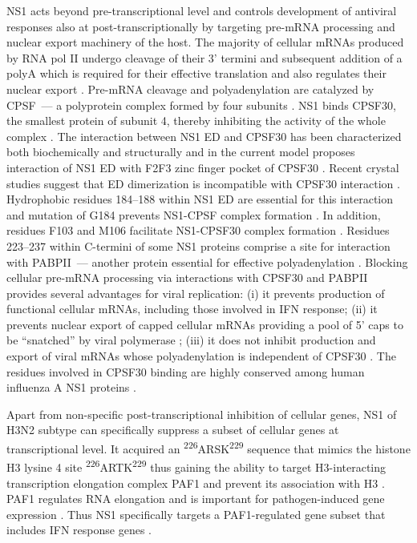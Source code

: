 		NS1 acts beyond pre-transcriptional level and controls development of antiviral responses also at post-transcriptionally by targeting pre-mRNA processing and nuclear export machinery of the host.
		The majority of cellular mRNAs produced by RNA pol II undergo cleavage of their 3' termini and subsequent addition of a \gls{polyA} which is required for their effective translation and also regulates their nuclear export \parencite{Vassalli1989, Zarkower1987, Huang1996}. Pre-mRNA cleavage and polyadenylation are catalyzed by \gls{CPSF}~--- a polyprotein complex formed by four subunits \parencite{Wilusz1990, Colgan1997}. NS1 binds \gls{CPSF}30, the smallest protein of subunit 4, thereby inhibiting the activity of the whole complex \parencite{Nemeroff1998}. The interaction between NS1 \gls{ED} and \gls{CPSF}30 has been  characterized both biochemically and structurally and in the current model proposes interaction of NS1 ED with F2F3 zinc finger pocket of \gls{CPSF}30 \parencite{Noah2003, Twu2006, Kochs2007, Das2008}. Recent crystal studies suggest that ED dimerization is incompatible with \gls{CPSF}30 interaction \parencite{Aramini2011, Kerry2011}. Hydrophobic residues 184--188 within NS1 ED are essential for this interaction and mutation of G184 prevents NS1-CPSF complex formation \parencite{Das2008}. In addition, residues F103 and M106 facilitate NS1-CPSF30 complex formation \parencite{Kochs2007, Das2008}. Residues 223--237 within C-termini of some \gls{NS1} proteins comprise a site for interaction with \gls{PABP}II~--- another protein essential for effective polyadenylation \parencite{Li2001a}. Blocking cellular pre-mRNA processing via interactions with \gls{CPSF}30 and \gls{PABP}II provides several advantages for viral replication: (i) it prevents production of functional cellular mRNAs, including those involved in \gls{IFN} response; (ii) it prevents nuclear export of capped cellular mRNAs providing a pool of 5' caps to be ``snatched'' by viral polymerase \parencite{Nemeroff1998}; (iii) it does not inhibit production and export of viral mRNAs whose polyadenylation is independent of \gls{CPSF}30 \parencite{Plotch1977}. The residues involved in \gls{CPSF}30 binding are highly conserved among human influenza A NS1 proteins \parencite{Kochs2007, Das2008}. 
		
		Apart from non-specific post-transcriptional inhibition of cellular genes, NS1 of H3N2 subtype can specifically suppress a subset of cellular genes at transcriptional level. It acquired an \textsuperscript{226}ARSK\textsuperscript{229} sequence that mimics the histone H3 lysine 4 site \textsuperscript{226}ARTK\textsuperscript{229} thus gaining the ability to target  H3-interacting transcription elongation complex PAF1 and prevent its association with H3 \parencite{Marazzi2012}. PAF1 regulates RNA elongation and is important for pathogen-induced gene expression \parencite{Newey2009}. Thus NS1 specifically targets a PAF1-regulated gene subset that includes \gls{IFN} response genes \parencite{Marazzi2012}.
		
